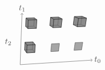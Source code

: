 \documentclass[orivec]{llncs} \usepackage[T1]{fontenc}
\begin{document}
\begin{example}
\[\begin{tikzpicture}[line join=round,opacity=0.7]
\filldraw[fill=gray](1.416,-.263)--(1.437,.072)--(1.333,.192)--(1.314,-.133)--cycle;
\filldraw[fill=gray](1.068,-.283)--(1.416,-.263)--(1.314,-.133)--(.978,-.151)--cycle;
\filldraw[fill=gray](.978,-.151)--(1.314,-.133)--(1.333,.192)--(.993,.175)--cycle;
\filldraw[fill=gray](3.098,-.169)--(3.424,-.151)--(3.474,.175)--(3.144,.158)--cycle;
\filldraw[fill=gray](1.068,-.283)--(1.084,.055)--(.993,.175)--(.978,-.151)--cycle;
\filldraw[fill=gray](3.066,.934)--(3.393,.946)--(3.444,1.29)--(3.112,1.279)--cycle;
\filldraw[fill=gray](3.24,.844)--(3.58,.857)--(3.393,.946)--(3.066,.934)--cycle;
\filldraw[fill=gray](3.58,.857)--(3.635,1.214)--(3.444,1.29)--(3.393,.946)--cycle;
\filldraw[fill=gray](1.084,.055)--(1.437,.072)--(1.333,.192)--(.993,.175)--cycle;
\filldraw[fill=gray](3.24,.844)--(3.29,1.202)--(3.112,1.279)--(3.066,.934)--cycle;
\filldraw[fill=gray](2.1,-.225)--(2.436,-.206)--(2.473,.125)--(2.132,.107)--cycle;
\draw[arrows=->](.786,-.786)--(3.886,-.589);
\filldraw[fill=gray](3.29,1.202)--(3.635,1.214)--(3.444,1.29)--(3.112,1.279)--cycle;
\filldraw[fill=gray](2.549,.817)--(2.589,1.179)--(2.436,1.258)--(2.4,.909)--cycle;
\filldraw[fill=gray](2.061,.896)--(2.4,.909)--(2.436,1.258)--(2.093,1.247)--cycle;
\filldraw[fill=gray](2.198,.803)--(2.549,.817)--(2.4,.909)--(2.061,.896)--cycle;
\filldraw[fill=gray](2.198,.803)--(2.232,1.167)--(2.093,1.247)--(2.061,.896)--cycle;
\filldraw[fill=gray](1.068,-.283)--(1.416,-.263)--(1.437,.072)--(1.084,.055)--cycle;
\filldraw[fill=gray](2.232,1.167)--(2.589,1.179)--(2.436,1.258)--(2.093,1.247)--cycle;
\filldraw[fill=gray](1.118,.761)--(1.482,.775)--(1.373,.87)--(1.023,.857)--cycle;
\filldraw[fill=gray](1.482,.775)--(1.506,1.143)--(1.394,1.225)--(1.373,.87)--cycle;
\filldraw[fill=gray](1.023,.857)--(1.373,.87)--(1.394,1.225)--(1.038,1.214)--cycle;
\filldraw[fill=gray](1.118,.761)--(1.136,1.131)--(1.038,1.214)--(1.023,.857)--cycle;
\filldraw[fill=gray](3.24,.844)--(3.58,.857)--(3.635,1.214)--(3.29,1.202)--cycle;
\filldraw[fill=gray](1.136,1.131)--(1.506,1.143)--(1.394,1.225)--(1.038,1.214)--cycle;
\filldraw[fill=gray](2.198,.803)--(2.549,.817)--(2.589,1.179)--(2.232,1.167)--cycle;
\draw[arrows=->](.786,-.786)--(.867,1.428);
\filldraw[fill=gray](1.118,.761)--(1.482,.775)--(1.506,1.143)--(1.136,1.131)--cycle;
\draw (4.114,-.574) node {$t_0$};\draw (.875,1.633) node {$t_1$};\draw (.277,.188) node {$t_2$};\end{tikzpicture}   \]
\end{example}
\end{document}
